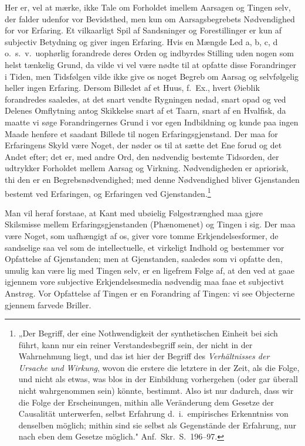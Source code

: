 \documentclass[12pt]{article}
\newcommand{\opage}[1]{\marginnote{\footnotesize\textit{[#1]}}}
\begin{document}
Her er, vel at mærke, ikke Tale om Forholdet imellem
Aarsagen og Tingen selv, der falder udenfor vor Bevidsthed, men
kun om Aarsagsbegrebets Nødvendighed for vor Erfaring. Et
vilkaarligt Spil af Sandsninger og Forestillinger er kun af
subjectiv Betydning og giver ingen Erfaring. Hvis en Mængde Led
a, b, c, d o.\ s.\ v.\ uophørlig forandrede deres Orden og
indbyrdes Stilling uden nogen som helst tænkelig Grund, da vilde
vi vel være nødte til at opfatte disse Forandringer i Tiden, men
Tidsfølgen vilde ikke give os noget Begreb om Aarsag og
selvfølgelig heller ingen Erfaring. Dersom Billedet af et Huus,
f.\ Ex., hvert Øieblik forandredes saaledes, at det snart vendte
Rygningen nedad, snart opad og ved Delenes Omflytning antog
Skikkelse snart af et Taarn, snart af en Hvalfisk, da maatte vi
søge Forandringernes Grund i vor egen Indbildning og kunde
paa ingen Maade henføre et saadant Billede til nogen
Erfaringsgjenstand. Der maa for Erfaringens Skyld være Noget, der
\opage{8} nøder os til at sætte det Ene forud og det Andet efter; det er,
med andre Ord, den nødvendig bestemte Tidsorden, der
udtrykker Forholdet mellem Aarsag og Virkning. Nødvendigheden
er apriorisk, thi den er en Begrebsnødvendighed; med denne
Nødvendighed bliver Gjenstanden bestemt ved Erfaringen, og
Erfaringen ved Gjenstanden.\footnote{%
„Der Begriff, der eine Nothwendigkeit der synthetischen Einheit bei sich
führt, kann nur ein reiner Verstandesbegriff sein, der nicht in der
Wahrnehmung liegt, und das ist hier der Begriff des \emph{Verhältnisses
der Ursache und Wirkung}, wovon die erstere die letztere in der
Zeit, als die Folge, und nicht als etwas, was blos in der Einbildung
vorhergehen (oder gar überall nicht wahrgenommen sein) könnte,
bestimmt. Also ist nur dadurch, dass wir die Folge der Erscheinungen,
mithin alle Veränderung dem Gesetze der Causalität unterwerfen, selbst
Erfahrung d.\ i.\ empirisches Erkenntniss von denselben möglich; mithin
sind sie selbst als Gegenstände der Erfahrung, nur nach eben dem
Gesetze möglich." Anf.\ Skr.\ S.~196--97.}

Man vil heraf forstaae, at Kant med ubøielig
Følgestrænghed maa gjøre Skilsmisse mellem Erfaringsgjenstanden
(Phænomenet) og Tingen i sig. Der maa være Noget, som
uafhængigt af os, giver vore tomme Erkjendelsesformer, de
sandselige saa vel som de intellectuelle, et virkeligt Indhold og
bestemmer vor Opfattelse af Gjenstanden; men at Gjenstanden,
saaledes som vi opfatte den, umulig kan være lig med Tingen
selv, er en ligefrem Følge af, at den ved at gaae igjennem vore
subjective Erkjendelsesmedia nødvendig maa faae et subjectivt
Anstrøg. Vor Opfattelse af Tingen er en Forandring af Tingen:
vi see Objecterne gjennem farvede Briller.
\end{document}
